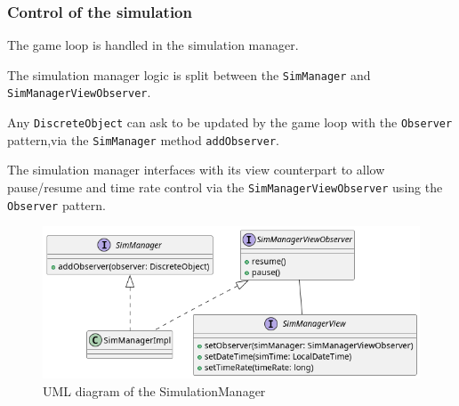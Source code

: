\subsubsection{Control of the simulation}

The game loop is handled in the simulation manager.

The simulation manager logic is split between the \texttt{SimManager} and \texttt{SimManagerViewObserver}.

Any \texttt{DiscreteObject} can ask to be updated by the game loop with the
\texttt{Observer} pattern,via the \texttt{SimManager} method \texttt{addObserver}.

The simulation manager interfaces with its view counterpart to allow pause/resume
and time rate control via the \texttt{SimManagerViewObserver} using the \texttt{Observer} pattern.

\begin{figure}[H]
\centering{}
\includegraphics[width=\textwidth,height=\textheight,keepaspectratio]{magnani/uml/simmanager.png}
\caption{UML diagram of the SimulationManager}
\label{magnani:uml:simmanager}
\end{figure}
